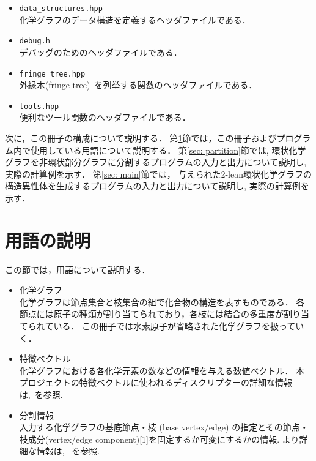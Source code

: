 \documentclass[11pt,titlepage,dvipdfmx,twoside]{jarticle}
\begin{document}
\begin{itemize}
\begin{itemize}
\begin{itemize}
		\item{\tt data\_structures.hpp}\\
			化学グラフのデータ構造を定義するヘッダファイルである． 
			
		\item{\tt debug.h}\\
			デバッグのためのヘッダファイルである．
			
		\item{\tt fringe\_tree.hpp}\\
			外縁木(fringe tree)~\cite{branch}を列挙する関数のヘッダファイルである．
			
		\item{\tt tools.hpp}\\
			便利なツール関数のヘッダファイルである．		
	\end{itemize}
    \end{itemize}
\end{itemize}

次に，この冊子の構成について説明する．
第\ref{sec:term}節では，この冊子およびプログラム内で使用している用語について説明する．
第\ref{sec: partition}節では, 
環状化学グラフを非環状部分グラフに分割するプログラムの入力と出力について説明し, 
実際の計算例を示す．
第\ref{sec: main}節では，
与えられた2-lean環状化学グラフの構造異性体を生成するプログラムの入力と出力について説明し, 
実際の計算例を示す．



\section{用語の説明}
\label{sec:term}

この節では，用語について説明する．
\begin{itemize}	
\item 化学グラフ\\
	化学グラフは節点集合と枝集合の組で化合物の構造を表すものである．
	各節点には原子の種類が割り当てられており，各枝には結合の多重度が割り当てられている．
	この冊子では水素原子が省略された化学グラフを扱っていく．


\item 特徴ベクトル\\
化学グラフにおける各化学元素の数などの情報を与える数値ベクトル．
本プロジェクトの特徴ベクトルに使われるディスクリプターの詳細な情報は,~\cite{branch}を参照.


\item 分割情報\\
入力する化学グラフの基底節点・枝 (base vertex/edge) の指定とその節点・枝成分(vertex/edge component)[1]を固定するか可変にするかの情報.
より詳細な情報は, ~\cite{branch}を参照.


\end{itemize}
\end{document}

